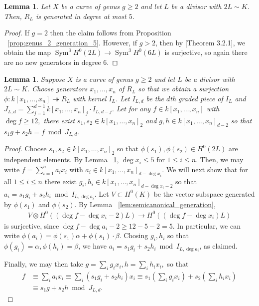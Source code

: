 \documentclass{amsart}
\theoremstyle{plain}
\newtheorem{lem}[thm]{Lemma}
\theoremstyle{definition}
\theoremstyle{remark}
\numberwithin{equation}{section}
\DeclareMathOperator{\sym}{Sym}
\begin{document}
\begin{lem}
\label{lem:generation_5}
Let $X$ be a curve of genus $g \geq 2$ and let $L$ be a divisor with $2 L \sim K$. Then, $R_L$ is generated in degree at most $5$.
\end{lem}
\begin{proof}
If $g = 2$ then the claim follows from 
Proposition ~\ref{prop:genus_2_generation_5}. However, if $g > 2$, then by \cite{vzb:stacky}[Theorem 3.2.1], we obtain the map $\sym^3 H^0(2L) \rightarrow \sym^3 H^0(6L)$ is surjective, so again there are no new generators in degree 6.
\end{proof}

\todo{This should be $k[x_1,\ldots, x_n]$ instead of $\sym H^0$.}
\begin{lem}
\label{lem:reducing_degree}
Suppose $X$ is a curve of genus $g \geq 2$ and let $L$ be a divisor with $2L \sim K$. Choose generators $x_1,\ldots, x_n$ of $R_L$ so that we obtain a surjection $\phi:k[x_1,\ldots, x_n] \twoheadrightarrow R_L$ with kernel $I_L$. Let $I_{L,d}$ be the $d$th graded piece of $I_L$ and $J_{L,d} = \sum_{j = 1}^{d-1}k[x_1, \ldots, x_n]_j \cdot I_{L,d-j}.$ Let for any $f \in k[x_1, \ldots, x_n]$ with $\deg f \geq 12,$ there exist $s_1,s_2 \in k[x_1, \ldots, x_n]_2$ and $g,h \in k[x_1, \ldots, x_n]_{d-2}$ so that $s_1g + s_2h = f \bmod J_{L,d}.$
\end{lem}
\begin{proof}
Choose $s_1,s_2 \in k[x_1, \ldots, x_n]_2$ so that $\phi(s_1),\phi(s_2) \in H^0(2L)$ are independent elements.
By Lemma ~\ref{lem:generation_5}, $\deg x_i \leq 5$ for $1 \leq i \leq n$. Then, we may write $f = \sum_{i=1}^{n}a_ix_i$ with $a_i \in k[x_1,\ldots, x_n]_{d-\deg x_i}$.
We will next show that for all $1 \leq i \leq n$ there exist $g_i, h_i \in k[x_1, \ldots, x_n]_{d - \deg x_i- 2}$ so that $a_i = s_1g_i + s_2h_i \bmod I_{L,\deg a_i}.$ 
Let $V \subset H^0(K)$ be the vector subspace generated by $\phi(s_1)$ and $\phi(s_2)$. By Lemma ~\ref{lem:semicanonical_generation},
\begin{align*}
	V \otimes H^0((\deg f-\deg x_i-2)L) \rightarrow H^0((\deg f-\deg x_i)L)
\end{align*}
is surjective, since $\deg f - \deg a_i - 2 \geq 12 - 5 - 2 = 5$. In particular, we can write $\phi(a_i) = \phi(s_1) \alpha + \phi(s_1) \cdot \beta$. Chosing $g_i,h_i$ so that $\phi(g_i) = \alpha,\phi(h_i) = \beta$, we have $a_i = s_1 g_i + s_2 h_i \bmod I_{L,\deg a_i}$, as claimed.

Finally, we may then take $g = \sum_{i}^{}g_ix_i,h = \sum_{i}^{}h_ix_i,$ so that 
\begin{align*}
	f &\equiv \sum_{i}^{}a_i x_i \equiv \sum_{i}^{}(s_1g_i + s_2h_i)x_i \equiv s_1 \left( \sum_{i}^{}g_i x_i \right) + s_2 \left( \sum_{i}^{}h_i x_i \right) \\
	&\equiv s_1 g + s_2 h \bmod J_{L,d}.
\end{align*}
\end{proof}
\end{document}
